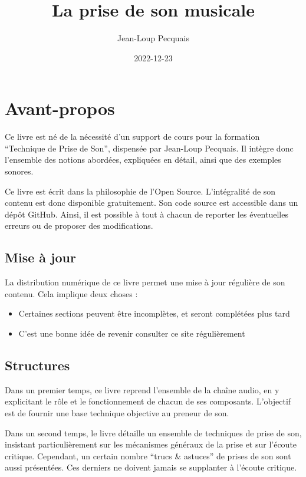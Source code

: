 \documentclass[
]{book}
\title{La prise de son musicale}
\author{Jean-Loup Pecquais}
\date{2022-12-23}
\providecommand{\tightlist}{%
  \setlength{\itemsep}{0pt}\setlength{\parskip}{0pt}}
\begin{document}
\maketitle

{
\setcounter{tocdepth}{1}
\tableofcontents
}
\hypertarget{avant-propos}{%
\chapter{Avant-propos}\label{avant-propos}}

Ce livre est né de la nécessité d'un support de cours pour la formation ``Technique de Prise de Son'', dispensée par Jean-Loup Pecquais. Il intègre donc l'ensemble des notions abordées, expliquées en détail, ainsi que des exemples sonores.

Ce livre est écrit dans la philosophie de l'Open Source. L'intégralité de son contenu est donc disponible gratuitement. Son code source est accessible dans un dépôt GitHub. Ainsi, il est possible à tout à chacun de reporter les éventuelles erreurs ou de proposer des modifications.

\hypertarget{mise-uxe0-jour}{%
\section{Mise à jour}\label{mise-uxe0-jour}}

La distribution numérique de ce livre permet une mise à jour régulière de son contenu. Cela implique deux choses :

\begin{itemize}
\tightlist
\item
  Certaines sections peuvent être incomplètes, et seront complétées plus tard
\item
  C'est une bonne idée de revenir consulter ce site régulièrement
\end{itemize}

\hypertarget{structures}{%
\section{Structures}\label{structures}}

Dans un premier temps, ce livre reprend l'ensemble de la chaîne audio, en y explicitant le rôle et le fonctionnement de chacun de ses composants. L'objectif est de fournir une base technique objective au preneur de son.

Dans un second temps, le livre détaille un ensemble de techniques de prise de son, insistant particulièrement sur les mécanismes généraux de la prise et sur l'écoute critique. Cependant, un certain nombre ``trucs \& astuces'' de prises de son sont aussi présentées. Ces derniers ne doivent jamais se supplanter à l'écoute critique.
\end{document}
